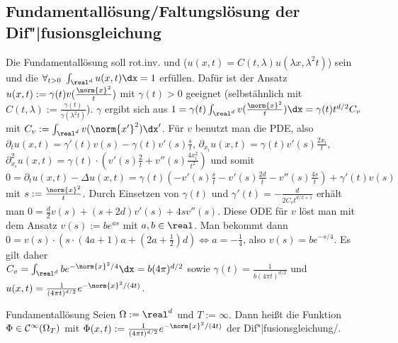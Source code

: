 \subsection{%
    Fundamentallösung/Faltungslösung der Dif"|fusionsgleichung%
}

\begin{Bem}
    Die Fundamentallösung soll rot.inv. und 
    ($u(x, t) = C(t, \lambda) u(\lambda x, \lambda^2 t)$) sein und die
     $\forall_{t > 0}\; \int_{\real^d} u(x, t) \dx = 1$ erfüllen.
    Dafür ist der Ansatz\\
    $u(x, t) := \gamma(t) v(\frac{\norm{x}^2}{t})$ mit $\gamma(t) > 0$
    geeignet (selbstähnlich mit $C(t, \lambda) := \frac{\gamma(t)}{\gamma(\lambda^2 t)}$).
    $\gamma$ ergibt sich aus
    $1 = \gamma(t) \int_{\real^d} v(\frac{\norm{x}^2}{t}) \dx = \gamma(t) t^{d/2} C_v$ mit
    $C_v := \int_{\real^d} v(\norm{x'}^2) \dx'$.
    Für $v$ benutzt man die PDE, also
    $\partial_t u(x, t) = \gamma'(t) v(s) - \gamma(t) v'(s) \frac{s}{t}$,
    $\partial_{x_i} u(x, t) = \gamma(t) v'(s) \frac{2x_i}{t}$,
    $\partial_{x_i}^2 u(x, t) = \gamma(t) \cdot (v'(s) \frac{2}{t} + v''(s) \frac{4x_i^2}{t^2})$
    und somit $0 = \partial_t u(x, t) - \Delta u(x, t)
    = \gamma(t) (-v'(s) \frac{s}{t} - v'(s) \frac{2d}{t} - v''(s) \frac{4s}{t}) + \gamma'(t) v(s)$
    mit $s := \frac{\norm{x}^2}{t}$.
    Durch Einsetzen von $\gamma(t)$ und $\gamma'(t) = -\frac{d}{2C_v t^{d/2+1}}$ erhält man
    $0 = \frac{d}{2} v(s) + (s + 2d) v'(s) + 4s v''(s)$.
    Diese ODE für $v$ löst man mit dem Ansatz $v(s) := be^{as}$ mit $a, b \in \real$.
    Man bekommt dann $0 = v(s) \cdot (s \cdot (4a + 1)a + (2a + \frac{1}{2})d)
    \iff a = -\frac{1}{4}$, also $v(s) = be^{-s/4}$.
    Es gilt daher\\
    $C_v = \int_{\real^d} be^{-\norm{x}^2/4} \dx = b (4\pi)^{d/2}$ sowie
    $\gamma(t) = \frac{1}{b(4\pi t)^{d/2}}$ und
    $u(x, t) = \frac{1}{(4\pi t)^{d/2}} e^{-\norm{x}^2/(4t)}$.
\end{Bem}

\linie

\begin{Def}{Fundamentallösung}
    Seien $\Omega := \real^d$ und $T := \infty$.
    Dann heißt die Funktion $\Phi \in \mathcal{C}^\infty(\Omega_T)$ mit
    $\Phi(x, t) := \frac{1}{(4\pi t)^{d/2}} e^{-\norm{x}^2/(4t)}$
     der Dif"|fusionsgleichung/.
\end{Def}

